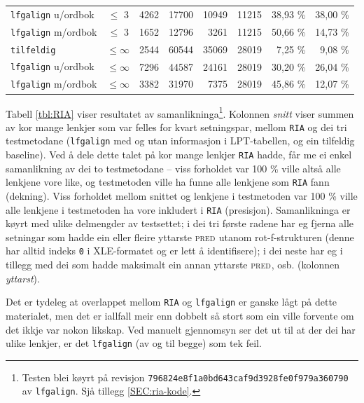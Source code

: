\documentclass[12pt,a4paper,oneside,draft]{report}
\newcommand{\F}[2]{\textsc{#1}\ensuremath{_{#2}}}
\newcommand{\PRED}{\F{pred}{}}
\begin{document}
\begin{table}[htb]
\begin{center}
\begin{tabular}{lcrrrrrr}
 \texttt{lfgalign} u/ordbok  &  $\leq$ 3       &   4262  &  17700  &    10949  &                 11215  &  38,93 \%           &  38,00 \%              \\
 \texttt{lfgalign} m/ordbok  &  $\leq$ 3       &   1652  &  12796  &     3261  &                 11215  &  50,66 \%           &  14,73 \%              \\
\hline
 \texttt{tilfeldig}          &  $\leq \infty$  &   2544  &  60544  &    35069  &                 28019  &  7,25 \%            &  9,08 \%               \\
 \texttt{lfgalign} u/ordbok  &  $\leq \infty$  &   7296  &  44587  &    24161  &                 28019  &  30,20 \%           &  26,04 \%              \\
 \texttt{lfgalign} m/ordbok  &  $\leq \infty$  &   3382  &  31970  &     7375  &                 28019  &  45,86 \%           &  12,07 \%              \\
\end{tabular}
\end{center}
\end{table}


Tabell \ref{tbl:RIA} viser resultatet av
 samanlikninga\footnote{Testen blei køyrt på revisjon
        \texttt{796824e8f1a0bd643caf9d3928fe0f979a360790} av \texttt{lfgalign}.  Sjå
        tillegg \ref{SEC:ria-kode}. }. Kolonnen \emph{snitt} viser summen av kor mange
 lenkjer som var felles for kvart setningspar, mellom \texttt{RIA} og dei tri
 testmetodane (\texttt{lfgalign} med og utan informasjon i LPT-tabellen, og
 ein tilfeldig baseline). Ved å dele dette talet på kor mange lenkjer
 \texttt{RIA} hadde, får me ei enkel samanlikning av dei to testmetodane --
 viss forholdet var 100 \% ville altså alle lenkjene vore like, og
 testmetoden ville ha funne alle lenkjene som \texttt{RIA} fann
 (dekning). Viss forholdet mellom snittet og lenkjene i testmetoden
 var 100 \% ville alle lenkjene i testmetoden ha vore inkludert i \texttt{RIA}
 (presisjon). Samanlikninga er køyrt med ulike delmengder av
 testsettet; i dei tri første radene har eg fjerna alle setningar som
 hadde ein eller fleire yttarste \PRED{} utanom rot\hyp{}f\hyp{}strukturen (denne
 har alltid indeks \texttt{0} i XLE\hyp{}formatet og er lett å identifisere); i
 dei neste har eg i tillegg med dei som hadde maksimalt ein annan
 yttarste \PRED{}, osb. (kolonnen \emph{yttarst}).

Det er tydeleg at overlappet mellom \texttt{RIA} og \texttt{lfgalign} er ganske lågt
 på dette materialet, men det er iallfall meir enn dobbelt så stort
 som ein ville forvente om det ikkje var nokon likskap. Ved manuelt
 gjennomsyn ser det ut til at der dei har ulike lenkjer, er det
 \texttt{lfgalign} (av og til begge) som tek feil.
\end{document}
